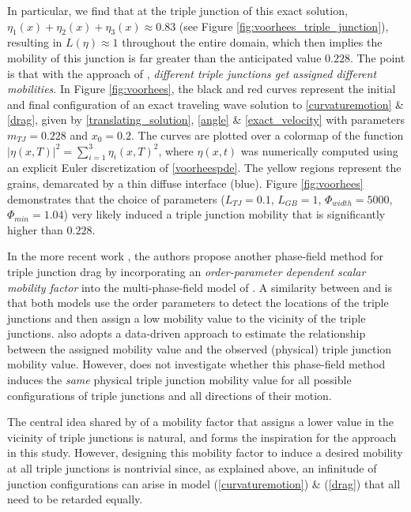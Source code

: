 \documentclass{article}
\theoremstyle{plain}
\theoremstyle{definition}
\theoremstyle{remark}
\begin{document}
In particular, we find that at the triple junction of this exact solution, $\eta_1(x) + \eta_2(x) + \eta_3(x) \approx 0.83$ (see Figure \ref{fig:voorhees_triple_junction}), resulting in $L(\eta)\approx 1$ throughout the entire domain, which then implies the mobility of this junction is far greater than the anticipated value $0.228$.
The point is that with the approach of \cite{johnsonvoorhees}, {\em different triple junctions get assigned different mobilities}.
In Figure \ref{fig:voorhees}, the black and red curves represent the initial and final configuration of an exact traveling wave solution to \eqref{curvaturemotion} \& \eqref{drag}, given by \eqref{translating_solution}, \eqref{angle} \& \eqref{exact_velocity} with parameters $m_{TJ} = 0.228$ and $x_0 = 0.2$. The curves are plotted over a colormap of the function $|\eta(x,T)|^2 = \sum_{i=1}^3 \eta_i(x,T)^2$, where $\eta(x,t)$ was numerically computed using an explicit Euler discretization of \eqref{voorheespde}. The yellow regions represent the grains, demarcated by a thin diffuse interface (blue). Figure \ref{fig:voorhees} demonstrates that the choice of parameters ($L_{TJ} = 0.1$, $L_{GB}=1$, $\Phi_{width}=5000$, $\Phi_{min}=1.04$) very likely induced a triple junction mobility that is significantly higher than $0.228$.

In the more recent work \cite{miyoshi2025}, the authors propose another phase-field method for triple junction drag by incorporating an \emph{order-parameter dependent scalar mobility factor} into the multi-phase-field model of \cite{steinbach}. A similarity between \cite{miyoshi2025} and \cite{johnsonvoorhees} is that both models use the order parameters to detect the locations of the triple junctions and then assign a low mobility value to the vicinity of the triple junctions. \cite{miyoshi2025} also adopts a data-driven approach to estimate the relationship between the assigned mobility value and the observed (physical) triple junction mobility value.
However, \cite{miyoshi2025} does not investigate whether this phase-field method induces the \emph{same} physical triple junction mobility value for all possible configurations of triple junctions and all directions of their motion.

The central idea shared by \cite{johnsonvoorhees,miyoshi2025} of a mobility factor that assigns a lower value in the vicinity of triple junctions is natural, and forms the inspiration for the approach in this study. 
However, designing this mobility factor to induce a desired mobility at all triple junctions is nontrivial since, as explained above, an infinitude of junction configurations can arise in model (\ref{curvaturemotion}) \& (\ref{drag}) that all need to be retarded equally.
\end{document}
